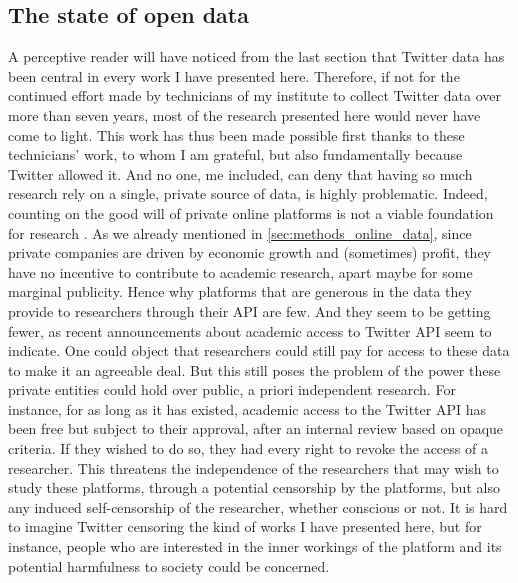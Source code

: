 \documentclass[../thesis.tex]{subfiles}
\begin{document}
\subsection{The state of open data}
A perceptive reader will have noticed from the last section that Twitter data has been
central in every work I have presented here. Therefore, if not for the continued effort
made by technicians of my institute to collect Twitter data over more than seven years,
most of the research presented here would never have come to light. This work has thus
been made possible first thanks to these technicians' work, to whom I am grateful, but
also fundamentally because Twitter allowed it. And no one, me included, can deny that
having so much research rely on a single, private source of data, is highly problematic.
Indeed, counting on the good will of private online platforms is not a viable foundation
for research \cite{AusloosOperationalizingResearch2020}. As we already mentioned in
\cref{sec:methods_online_data}, since private companies are driven by economic growth
and (sometimes) profit, they have no incentive to contribute to academic research, apart
maybe for some marginal publicity. Hence why platforms that are generous in the data
they provide to researchers through their \ac{API} are few. And they seem to be getting
fewer, as recent announcements about academic access to Twitter \ac{API} seem to
indicate. One could object that researchers could still pay for access to these data to
make it an agreeable deal. But this still poses the problem of the power these private
entities could hold over public, a priori independent research. For instance, for as
long as it has existed, academic access to the Twitter \ac{API} has been free but
subject to their approval, after an internal review based on opaque criteria. If they
wished to do so, they had every right to revoke the access of a researcher. This
threatens the independence of the researchers that may wish to study these platforms,
through a potential censorship by the platforms, but also any induced self-censorship of
the researcher, whether conscious or not. It is hard to imagine Twitter censoring the
kind of works I have presented here, but for instance, people who are interested in the
inner workings of the platform and its potential harmfulness to society could be
concerned.
\end{document}
